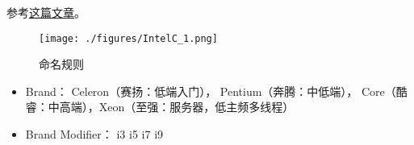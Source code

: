 
\begin{issues}
\issueDraft
\end{issues}

参考\href{https://www.itechtics.com/processor-generations/}{这篇文章}。

\begin{figure}[ht]
\centering
\texttt{[image: ./figures/IntelC\_1.png]}
\caption{命名规则} \label{IntelC_fig1}
\end{figure}

\begin{itemize}
\item Brand： Celeron（赛扬：低端入门）， Pentium（奔腾：中低端）， Core（酷睿：中高端），Xeon（至强：服务器，低主频多线程）
\item Brand Modifier： i3 i5 i7 i9
\end{itemize}
